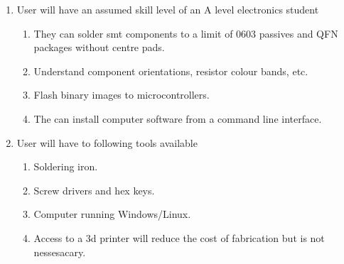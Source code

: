 \documentclass[12pt,a4paper]{article}
\begin{document}
\begin{enumerate}[label*=\arabic*.]
\begin{enumerate}[label*=\arabic*.]
\begin{enumerate}[label*=\arabic*.]
		\end{enumerate}
	\end{enumerate}
\item User will have an assumed skill level of an A level electronics student
		\begin{enumerate}[label*=\arabic*.]
		\item They can solder \gls{smt} components to a limit of 0603 passives and QFN packages without centre pads. 
		\item Understand component orientations, resistor colour bands, etc.
		\item Flash binary images to microcontrollers.
		\item The can install computer software from a command line interface.
		\end{enumerate}
\item User will have to following tools available
		\begin{enumerate}[label*=\arabic*.]
		\item Soldering iron.
		\item Screw drivers and hex keys.
		\item Computer running Windows/Linux.
		\item Access to a \gls{3d} printer will reduce the cost of fabrication but is not nessesacary.
		\end{enumerate}
\end{enumerate}
\end{document}
